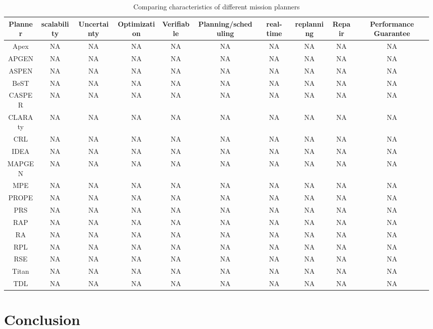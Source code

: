 \documentclass[conference]{IEEEtran}
\begin{document}
   \begin{table*}[t]
     \centering
     \caption{Comparing characteristics of different mission planners} 
     \begin{tabular}{c|c|c|c|c|c|c|c|c|c}
     \hline
     Planner & scalability & Uncertainty  & Optimization & Verifiable  & Planning/scheduling   &real-time &replanning  &Repair  & Performance Guarantee\\
        \hline
        Apex &NA &NA &NA &NA &NA &NA &NA &NA &NA\\
        APGEN &NA &NA &NA &NA &NA &NA &NA &NA &NA\\
        ASPEN &NA &NA &NA &NA &NA &NA &NA &NA &NA\\
        BeST &NA &NA &NA &NA &NA &NA &NA &NA &NA\\
        CASPER  &NA &NA &NA &NA &NA &NA &NA &NA &NA\\
        CLARAty &NA &NA &NA &NA &NA &NA &NA &NA &NA\\
        CRL &NA &NA &NA &NA &NA &NA &NA &NA &NA\\
        IDEA &NA &NA &NA &NA &NA &NA &NA &NA &NA\\
        MAPGEN &NA &NA &NA &NA &NA &NA &NA &NA &NA\\
        MPE &NA &NA &NA &NA &NA &NA &NA &NA &NA\\
        PROPE &NA &NA &NA &NA &NA &NA &NA &NA &NA\\
        PRS &NA &NA &NA &NA &NA &NA &NA &NA &NA\\
        RAP &NA &NA &NA &NA &NA &NA &NA &NA &NA\\
        RA &NA &NA &NA &NA &NA &NA &NA &NA &NA\\   
        RPL &NA &NA &NA &NA &NA &NA &NA &NA &NA\\  
        RSE &NA &NA &NA &NA &NA &NA &NA &NA &NA\\
        Titan &NA &NA &NA &NA &NA &NA &NA &NA &NA\\
        TDL &NA &NA &NA &NA &NA &NA &NA &NA &NA\\
        \hline
      \end{tabular}
    \end{table*}


\section{Conclusion}
\end{document}
